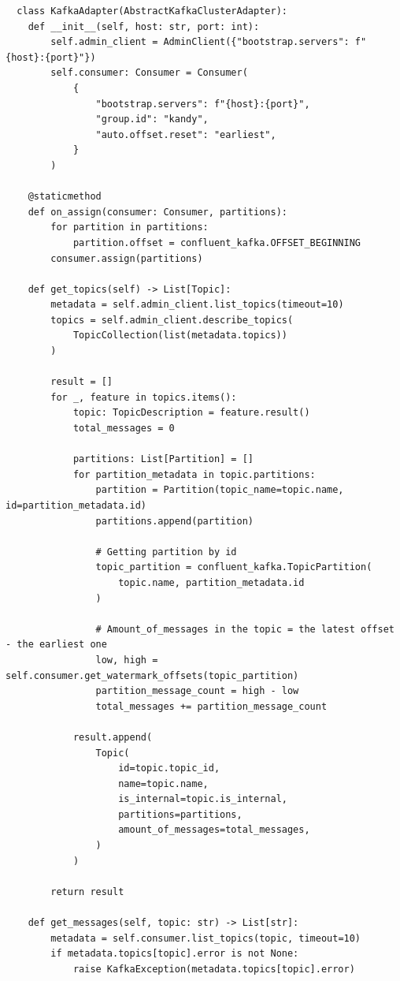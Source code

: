 \documentclass[10pt , a4paper]{report}
\newenvironment{code}{\captionsetup{type=listing}}{}
\begin{document}
\begin{code}
  \begin{verbatim}
  class KafkaAdapter(AbstractKafkaClusterAdapter):
    def __init__(self, host: str, port: int):
        self.admin_client = AdminClient({"bootstrap.servers": f"{host}:{port}"})
        self.consumer: Consumer = Consumer(
            {
                "bootstrap.servers": f"{host}:{port}",
                "group.id": "kandy",
                "auto.offset.reset": "earliest",
            }
        )

    @staticmethod
    def on_assign(consumer: Consumer, partitions):
        for partition in partitions:
            partition.offset = confluent_kafka.OFFSET_BEGINNING
        consumer.assign(partitions)

    def get_topics(self) -> List[Topic]:
        metadata = self.admin_client.list_topics(timeout=10)
        topics = self.admin_client.describe_topics(
            TopicCollection(list(metadata.topics))
        )

        result = []
        for _, feature in topics.items():
            topic: TopicDescription = feature.result()
            total_messages = 0

            partitions: List[Partition] = []
            for partition_metadata in topic.partitions:
                partition = Partition(topic_name=topic.name, id=partition_metadata.id)
                partitions.append(partition)

                # Getting partition by id
                topic_partition = confluent_kafka.TopicPartition(
                    topic.name, partition_metadata.id
                )

                # Amount_of_messages in the topic = the latest offset - the earliest one
                low, high = self.consumer.get_watermark_offsets(topic_partition)
                partition_message_count = high - low
                total_messages += partition_message_count

            result.append(
                Topic(
                    id=topic.topic_id,
                    name=topic.name,
                    is_internal=topic.is_internal,
                    partitions=partitions,
                    amount_of_messages=total_messages,
                )
            )

        return result

    def get_messages(self, topic: str) -> List[str]:
        metadata = self.consumer.list_topics(topic, timeout=10)
        if metadata.topics[topic].error is not None:
            raise KafkaException(metadata.topics[topic].error)


\end{verbatim}
\end{code}
\end{document}
